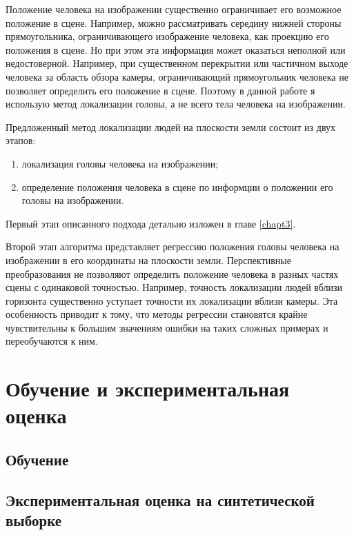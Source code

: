 Положение человека на изображении существенно ограничивает его возможное положение в сцене. Например, можно рассматривать середину нижней стороны прямоугольника, ограничивающего изображение человека, как проекцию его положения в сцене. Но при этом эта информация может оказаться неполной или недостоверной. Например, при существенном перекрытии или частичном выходе человека за область обзора камеры, ограничивающий прямоугольник человека не позволяет определить его положение в сцене. Поэтому в данной работе я использую метод локализации головы, а не всего тела человека на изображении.

Предложенный метод локализации людей на плоскости земли состоит из двух этапов:
\begin{enumerate}
	\item локализация головы человека на изображении;
	\item определение положения человека в сцене по информции о положении его головы на изображении.
\end{enumerate}
Первый этап описанного подхода детально изложен в главе \ref{chapt3}.

Второй этап алгоритма представляет регрессию положения головы человека на изображении в его координаты на плоскости земли. Перспективные преобразования не позволяют определить положение человека в разных частях сцены с одинаковой точностью. Например, точность локализации людей вблизи горизонта существенно уступает точности их локализации вблизи камеры. Эта особенность приводит к тому, что методы регрессии становятся крайне чувствительны к большим значениям ошибки на таких сложных примерах и переобучаются к ним.

\section{Обучение и экспериментальная оценка}
\subsection{Обучение}
\subsection{Экспериментальная оценка на синтетической выборке}
